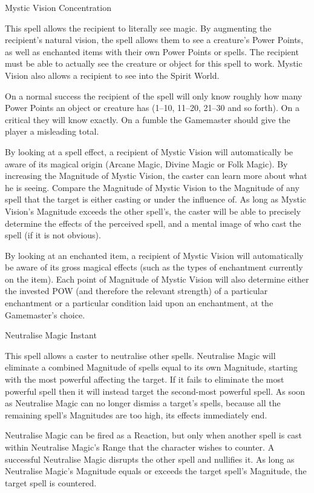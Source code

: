 \begin{rpg-spell}
{Mystic Vision}
{Concentration}

This spell allows the recipient to literally see magic. By augmenting the recipient’s natural vision, the spell allows them to see a creature’s Power Points, as well as enchanted items with their own Power Points or spells. The recipient must be able to actually see the creature or object for this spell to work. Mystic Vision also allows a recipient to see into the Spirit World.

On a normal success the recipient of the spell will only know roughly how many Power Points an object or creature has (1–10, 11–20, 21–30 and so forth). On a critical they will know exactly. On a fumble the Gamemaster should give the player a misleading total.

By looking at a spell effect, a recipient of Mystic Vision will automatically be aware of its magical origin (Arcane Magic, Divine Magic or Folk Magic). By increasing the Magnitude of Mystic Vision, the caster can learn more about what he is seeing. Compare the Magnitude of Mystic Vision to the Magnitude of any spell that the target is either casting or under the influence of. As long as Mystic Vision’s Magnitude exceeds the other spell’s, the caster will be able to precisely determine the effects of the perceived spell, and a mental image of who cast the spell (if it is not obvious). 

By looking at an enchanted item, a recipient of Mystic Vision will automatically be aware of its gross magical effects (such as the types of enchantment currently on the item). Each point of Magnitude of Mystic Vision will also determine either the invested POW (and therefore the relevant strength) of a particular enchantment or a particular condition laid upon an enchantment, at the Gamemaster’s choice.
\end{rpg-spell}


\begin{rpg-spell}
{Neutralise Magic}
{Instant}

This spell allows a caster to neutralise other spells. Neutralise Magic will eliminate a combined Magnitude of spells equal to its own Magnitude, starting with the most powerful affecting the target. If it fails to eliminate the most powerful spell then it will instead target the second-most powerful spell. As soon as Neutralise Magic can no longer dismiss a target’s spells, because all the remaining spell’s Magnitudes are too high, its effects immediately end. 

Neutralise Magic can be fired as a Reaction, but only when another spell is cast within Neutralise Magic’s Range that the character wishes to counter. A successful Neutralise Magic disrupts the other spell and nullifies it. As long as Neutralise Magic’s Magnitude equals or exceeds the target spell’s Magnitude, the target spell is countered. 
\end{rpg-spell}

